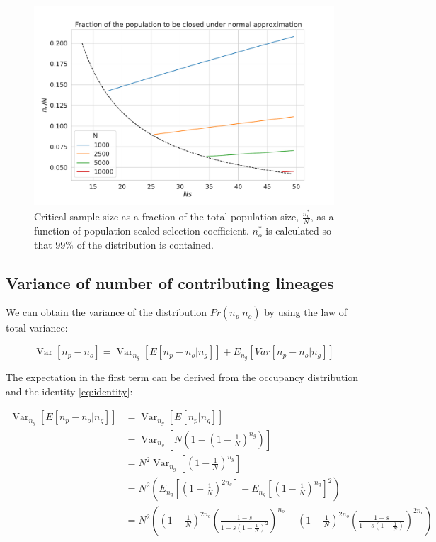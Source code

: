 \documentclass[review]{elsarticle}
\newcommand{\Var}{\operatorname{Var}}
\begin{document}
\begin{figure}
  \centering
  \includegraphics[width=\textwidth]{fig/critical_normal_fraction.pdf}
  \caption{Critical sample size as a fraction of the total population size, $\frac{n_o^*}{N}$, as a
    function of population-scaled selection coefficient. $n_o^*$ is calculated so that $99\%$ of the
    distribution is contained.}
  \label{fig:apx:critical-fraction}
\end{figure}

\subsection{Variance of number of contributing lineages}
\label{subsec:apx:variance}

We can obtain the variance of the distribution $Pr(n_p | n_o)$ by using the law of total variance:

\begin{equation}
  \label{eq:apx:var}
\Var\left[n_p-n_o \right] = \Var_{n_g}\left[E\left[n_p-n_o | n_g \right]\right]+  E_{n_g}\left[Var\left[n_p-n_o | n_g \right]\right] 
\end{equation}

The expectation in the first term can be derived from the occupancy distribution and the identity \ref{eq:identity}:

\begin{equation}
\begin{split}
\Var_{n_g}\left[E\left[n_p-n_o | n_g \right]\right] &= \Var_{n_g}\left[E\left[n_p| n_g \right]\right] \\
&= \Var_{n_g}\left[N\left(1-(1-\frac{1}{N})^{n_g} \right) \right] \\ 
&= N^2 \Var_{n_g}\left[(1-\frac{1}{N})^{n_g} \right] \\
&= N^2 \left( E_{n_g}\left[(1-\frac{1}{N})^{2n_g} \right] - E_{n_g}\left[(1-\frac{1}{N})^{n_g} \right]^2\right) \\
&= N^2 \left( \left(1-\frac{1}{N}\right)^{2n_o} \left(\frac{1-s}{1-s  \left(1-\frac{1}{N}\right)^2}\right)^{n_o} 
-   \left(1-\frac{1}{N}\right)^{2n_o} \left(\frac{1-s}{1-s  \left(1-\frac{1}{N}\right)}\right)^{2n_o} \right) \\
\end{split}
\end{equation}
\end{document}
